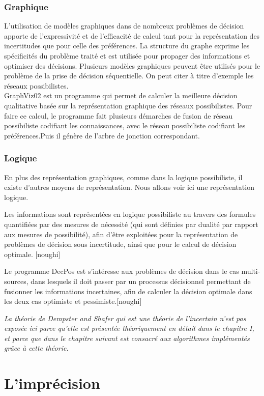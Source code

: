 \subsubsection{Graphique}
L’utilisation de modèles graphiques dans de nombreux problèmes de décision apporte de
l’expressivité et de l’efficacité de calcul tant pour la représentation des incertitudes que pour celle
des préférences. La structure du graphe exprime les spécificités du problème traité et est utilisée
pour propager des informations et optimiser des décisions. Plusieurs modèles graphiques peuvent
être utilisés pour le problème de la prise de décision séquentielle. On peut citer à titre d’exemple les réseaux possibilistes.\\
GraphViz02 est un programme qui permet de calculer la meilleure décision qualitative basée sur la représentation graphique des réseaux possibilistes. Pour faire ce calcul, le programme fait plusieurs démarches de fusion de réseau possibiliste codifiant les connaissances, avec le réseau possibiliste codifiant les préférences.Puis il génère de l’arbre de jonction correspondant.\cite{hkhaoulaThesis}
\subsubsection{Logique}
En plus des représentation graphiques, comme dans la logique possibiliste, il existe d’autres moyens de
représentation. Nous allons voir ici une représentation logique.

Les informations sont représentées en logique possibiliste au travers des formules quantifiées par des mesures de nécessité (qui sont définies par dualité par rapport aux mesures de possibilité), afin d'être exploitées pour la représentation de problèmes de décision sous incertitude, ainsi que pour le calcul de décision optimale. [noughi]

Le programme DecPos est s'intéresse aux problèmes de décision dans le cas multi-sources, dans lesquels il doit passer par un processus décisionnel permettant de fusionner les informations incertaines, afin de calculer la décision optimale dans les deux cas optimiste et pessimiste.[noughi]

\emph{ La théorie de Dempster and Shafer qui est une théorie de l'incertain n'est pas exposée ici parce qu’elle est présentée théoriquement en détail dans le chapitre I, et parce que dans le chapitre suivant est consacré aux algorithmes implémentés grâce à cette théorie.}
\section{L’imprécision}

